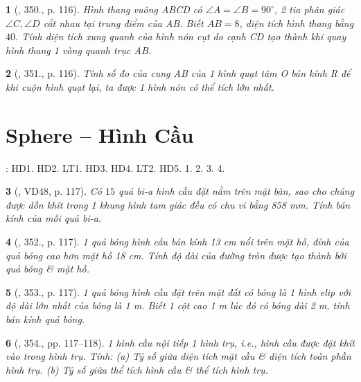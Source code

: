 \documentclass{article}
\newtheorem{baitoan}{}
\begin{document}
\begin{baitoan}[\cite{Binh_Toan_9_tap_2}, 350., p. 116]
	Hình thang vuông ABCD có $\angle A = \angle B = 90^\circ$, 2 tia phân giác $\angle C,\angle D$ cắt nhau tại trung điểm của AB. Biết $AB = 8$, diện tích hình thang bằng $40$. Tính diện tích xung quanh của hình nón cụt do cạnh CD tạo thành khi quay hình thang 1 vòng quanh trục AB.
\end{baitoan}

\begin{baitoan}[\cite{Binh_Toan_9_tap_2}, 351., p. 116]
	Tính số đo của cung AB của 1 hình quạt tâm O bán kính R để khi cuộn hình quạt lại, ta được 1 hình nón có thể tích lớn nhất.
\end{baitoan}


\section{Sphere -- Hình Cầu}
\cite[Chap. X, \S3, pp. 104--108]{SGK_Toan_9_Canh_Dieu_tap_1}: HD1. HD2. LT1. HD3. HD4. LT2. HD5. 1. 2. 3. 4.

\begin{baitoan}[\cite{Binh_Toan_9_tap_2}, VD48, p. 117]
	Có $15$ quả bi-a hình cầu đặt nằm trên mặt bàn, sao cho chúng được dồn khít trong 1 khung hình tam giác đều có chu vi bằng {\rm858 mm}. Tính bán kính của mỗi quả bi-a.
\end{baitoan}

\begin{baitoan}[\cite{Binh_Toan_9_tap_2}, 352., p. 117]
	1 quả bóng hình cầu bán kính {\rm13 cm} nổi trên mặt hồ, đỉnh của quả bóng cao hơn mặt hồ {\rm18 cm}. Tính độ dài của đường tròn được tạo thành bởi quả bóng \& mặt hồ.
\end{baitoan}

\begin{baitoan}[\cite{Binh_Toan_9_tap_2}, 353., p. 117]
	1 quả bóng hình cầu đặt trên mặt đất có bóng là 1 hình elip với độ dài lớn nhất của bóng là {\rm1 m}. Biết 1 cột cao {\rm1 m} lúc đó có bóng dài {\rm2 m}, tính bán kính quả bóng.
\end{baitoan}

\begin{baitoan}[\cite{Binh_Toan_9_tap_2}, 354., pp. 117--118]
	1 hình cầu nội tiếp 1 hình trụ, i.e., hình cầu được đặt khít vào trong hình trụ. Tính: (a) Tỷ số giữa diện tích mặt cầu \& diện tích toàn phần hình trụ. (b) Tỷ số giữa thể tích hình cầu \& thể tích hình trụ.
\end{baitoan}
\end{document}
